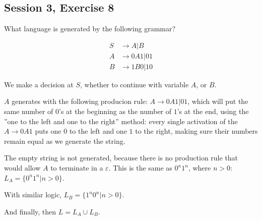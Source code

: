 \subsection{Session 3, Exercise 8}


What language is generated by the following grammar?

\begin{align*}
S &\rightarrow A | B\\
A &\rightarrow 0A1 | 01\\
B &\rightarrow 1B0 | 10
\end{align*}


We make a decision at $S$, whether to continue with variable $A$, or $B$.

$A$ generates with the following producion rule: $A \rightarrow 0A1|01$, which will put the same number of $0$'s at the beginning as the number of $1$'s at the end, using the ''one to the left and one to the right'' method: every single activation of the $A \rightarrow 0A1$ puts one $0$ to the left and one $1$ to the right, making sure their numbers remain equal as we generate the string.

The empty string is not generated, because there is no production rule that would allow $A$ to terminate in a $\varepsilon$. This is the same as $0^n1^n$, where $n>0$: $L_A=\{0^n1^n|n>0\}$.

With similar logic, $L_B=\{1^n0^n|n>0\}$.

And finally, then $L = L_A \cup L_B$.